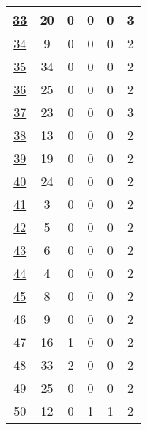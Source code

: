 \begin{table}
\begin{center}
\begin{tabular}{|c|c|c|c|c|c|}
			\hline
			\href{https://sparql.orthodb.org/.well-known/sparql-examples/19}{33} & 20 & 0 & 0 & 0 & 3 \\
			\hline
			\href{https://sparql.orthodb.org/.well-known/sparql-examples/17}{34} & 9 & 0 & 0 & 0 & 2 \\
			\hline
			\href{https://sparql.orthodb.org/.well-known/sparql-examples/20}{35} & 34 & 0 & 0 & 0 & 2 \\
			\hline
			\href{https://www.bgee.org/sparql/.well-known/sparql-examples/020}{36} & 25 & 0 & 0 & 0 & 2 \\
			\hline
			\href{https://www.bgee.org/sparql/.well-known/sparql-examples/016}{37} & 23 & 0 & 0 & 0 & 3 \\
			\hline
			\href{https://www.bgee.org/sparql/.well-known/sparql-examples/017}{38} & 13 & 0 & 0 & 0 & 2 \\
			\hline
			\href{https://www.bgee.org/sparql/.well-known/sparql-examples/019}{39} & 19 & 0 & 0 & 0 & 2 \\
			\hline
			\href{https://www.bgee.org/sparql/.well-known/sparql-examples/018}{40} & 24 & 0 & 0 & 0 & 2 \\
			\hline
			\href{https://sparql.rhea-db.org/.well-known/sparql-examples/20_search_chemical_names_in_japanese}{41} & 3 & 0 & 0 & 0 & 2 \\
			\hline
			\href{https://sparql.rhea-db.org/.well-known/sparql-examples/12}{42} & 5 & 0 & 0 & 0 & 2 \\
			\hline
			\href{https://sparql.rhea-db.org/.well-known/sparql-examples/18}{43} & 6 & 0 & 0 & 0 & 2 \\
			\hline
			\href{https://sparql.rhea-db.org/.well-known/sparql-examples/11}{44} & 4 & 0 & 0 & 0 & 2 \\
			\hline
			\href{https://sparql.rhea-db.org/.well-known/sparql-examples/13}{45} & 8 & 0 & 0 & 0 & 2 \\
			\hline
			\href{https://sparql.omabrowser.org/.well-known/sparql-examples/3}{46} & 9 & 0 & 0 & 0 & 2 \\
			\hline
			\href{https://sparql.omabrowser.org/.well-known/sparql-examples/14}{47} & 16 & 1 & 0 & 0 & 2 \\
			\hline
			\href{https://biosoda.unil.ch/emi/sparql/.well-known/sparql-examples/006}{48} & 33 & 2 & 0 & 0 & 2 \\
			\hline
			\href{https://biosoda.unil.ch/emi/sparql/.well-known/sparql-examples/001}{49} & 25 & 0 & 0 & 0 & 2 \\
			\hline
			\href{https://purl.org/emi#examples011a}{50} & 12 & 0 & 1 & 1 & 2 \\

\end{tabular}
\end{center}
\end{table}
